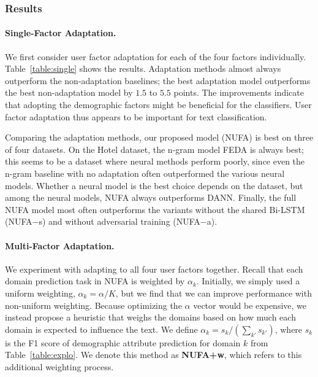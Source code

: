 \subsubsection{Results}

\paragraph{Single-Factor Adaptation.} We first consider user factor adaptation for each of the four factors individually. 
Table~\ref{table:single} shows the results.
Adaptation methods almost always outperform the non-adaptation baselines;
the best adaptation model outperforms the best non-adaptation model by $1.5$ to $5.5$ points. 
The improvements indicate that adopting the demographic factors might be beneficial for the classifiers. User factor adaptation thus appears to be important for text classification. 

Comparing the adaptation methods,
our proposed model (NUFA) is best on three of four datasets.
On the Hotel dataset, the n-gram model FEDA is always best;
this seems to be a dataset where neural methods perform poorly, since even the n-gram baseline with no adaptation often outperformed the various neural models. 
Whether a neural model is the best choice depends on the dataset,
but among the neural models, NUFA always outperforms DANN.
Finally, the full NUFA model most often outperforms the variants without the shared Bi-LSTM (NUFA$-$s) and without adversarial training (NUFA$-$a). 


\paragraph{Multi-Factor Adaptation.} We experiment with adapting to all four user factors together.
Recall that each domain prediction task in NUFA is weighted by $\alpha_k$.
Initially, we simply used a uniform weighting, $\alpha_k = \alpha/K$,
but we find that we can improve performance with non-uniform weighting.
Because optimizing the $\alpha$ vector would be expensive, 
we instead propose a heuristic that weighs the domains
based on how much each domain is expected to influence the text.
We define $\alpha_k = s_k / (\sum_{k'} s_{k'})$, where $s_k$ is the F1 score of demographic attribute prediction for domain $k$ from Table~\ref{table:explo}.
We denote this method as {\bf NUFA+w}, which refers to this additional weighting process.

